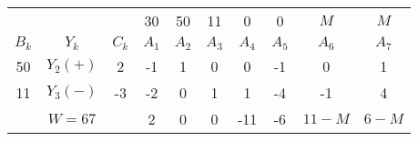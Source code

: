     \begin{tabular}{cccccccccc}
    \hline
    \hline
            &         &         & 30      & 50      & 11      & 0       & 0       & $M$     & $M$ \bigstrut[t]\\
    $B_k$   & $Y_k$   & $C_k$   & $A_1$   & $A_2$   & $A_3$   & $A_4$   & $A_5$   & $A_6$   & $A_7$ \bigstrut[b]\\
    \hline
    50      & $Y_2(+)$ & 2       & -1      & 1       & 0       & 0       & -1      & 0       & 1 \bigstrut[t]\\
    11      & $Y_3(-)$ & -3      & -2      & 0       & 1       & 1       & -4      & -1      & 4 \bigstrut[b]\\
    \hline
            & $W=67$  &         & 2       & 0       & 0       & -11     & -6      & $11-M$  & $6-M$ \bigstrut\\
    \hline
    \hline
    \end{tabular}%
